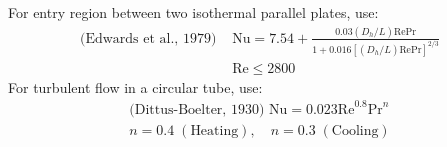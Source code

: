 \begin{multicols*}{2}
For entry region between two isothermal parallel plates, use:
\begin{align*}
    \text{(Edwards et al., 1979) } &\text{Nu} = 7.54 + \frac{0.03(D_h/L) \text{Re} \text{Pr}}{1 + 0.016[(D_h/L) \text{Re} \text{Pr}]^{2/3}} \\
    &\text{Re} \leq 2800
\end{align*}
For turbulent flow in a circular tube, use:
\begin{align*}
    \text{(Dittus-Boelter, 1930) } \text{Nu} = 0.023 \text{Re}^{0.8} \text{Pr}^{n}  \\
    n = 0.4 \; (\text{Heating}), \quad n = 0.3 \; (\text{Cooling}) 
\end{align*}
\end{multicols*}

